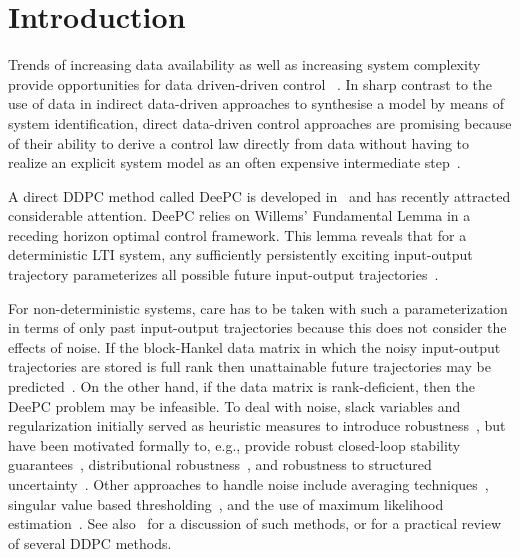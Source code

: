 \section{Introduction}\label{sec:introduction}
\noindent Trends of increasing data availability as well as increasing system complexity provide opportunities for data driven-driven control%
~\citep{Hou2013}. In sharp contrast to the use of data in %
indirect data-driven approaches to synthesise a model by means of system identification, direct data-driven control approaches are promising because of their ability to derive a control law directly from data without having to realize an explicit system model as an often expensive intermediate step~\citep{Hjalmarsson2005}.

A direct \ac{DDPC} method called \acf{DeePC} is developed in~\cite{Coulson2019} and has recently attracted considerable attention. \ac{DeePC} relies on Willems' Fundamental Lemma in a receding horizon optimal control framework. This lemma reveals that for a deterministic \ac{LTI} system, any sufficiently persistently exciting input-output trajectory parameterizes all possible future input-output trajectories~\citep{Willems2005}.

For non-deterministic systems, care has to be taken with such a parameterization in terms of only past input-output trajectories because this does not consider the effects of noise. If the block-Hankel data matrix in which the noisy input-output trajectories are stored is full rank then unattainable future trajectories may be predicted~\citep{Markovsky2022}. On the other hand, if the data matrix is rank-deficient, then the \ac{DeePC} problem may be infeasible. To deal with noise, slack variables and regularization initially served as heuristic measures to introduce robustness~\citep{Coulson2019}, but have been motivated formally to, e.g., provide robust closed-loop stability guarantees~\citep{Berberich2021}, distributional robustness~\citep{Coulson2019a}, and robustness to structured uncertainty~\citep{Huang2023}. Other approaches to handle noise include averaging techniques~\citep{Jo2022}, singular value based thresholding~\citep{Sassella2022}, and the use of maximum likelihood estimation~\citep{Yin2023}. See also~\cite{Sassella2023} for a discussion of such methods, or \cite{Verheijen2023} for a practical review of several \ac{DDPC} methods.%

